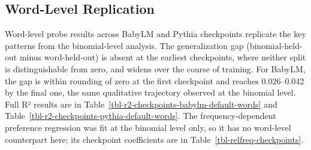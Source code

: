 \documentclass[11pt]{article}
\begin{document}
\endgroup{}

\subsection{Word-Level Replication}\label{sec-appendix-words-only-exp3}

Word-level probe results across BabyLM and Pythia checkpoints replicate
the key patterns from the binomial-level analysis. The generalization
gap (binomial-held-out minus word-held-out) is absent at the earliest
checkpoints, where neither split is distinguishable from zero, and
widens over the course of training. For BabyLM, the gap is within
rounding of zero at the first checkpoint and reaches 0.026--0.042 by the
final one, the same qualitative trajectory observed at the binomial
level. Full R² results are in
Table~\ref{tbl-r2-checkpoints-babylm-default-words} and
Table~\ref{tbl-r2-checkpoints-pythia-default-words}. The
frequency-dependent preference regression was fit at the binomial level
only, so it has no word-level counterpart here; its checkpoint
coefficients are in Table~\ref{tbl-relfreq-checkpoints}.

\begingroup\fontsize{8}{10}\selectfont
\end{document}
